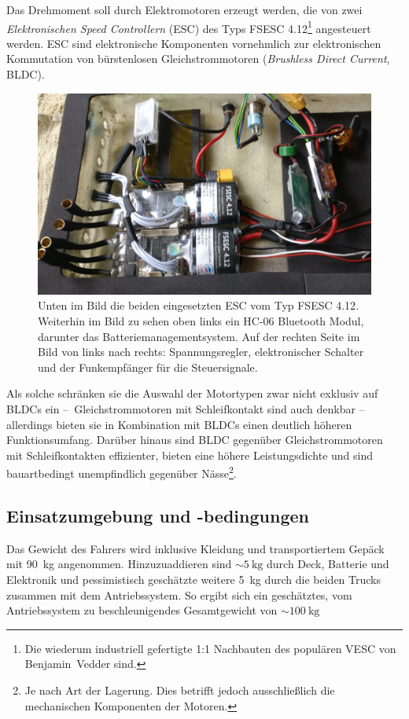 			Das Drehmoment soll durch Elektromotoren erzeugt werden, die von zwei \textit{Elektronischen Speed Controllern} (ESC) des Typs \textsc{FSESC 4.12}\footnote{\hspace{1mm} Die wiederum industriell gefertigte 1:1 Nachbauten des populären \textsc{VESC} von Benjamin~Vedder sind.} angesteuert werden.
			ESC sind elektronische Komponenten vornehmlich zur elektronischen Kommutation von bürstenlosen Gleichstrommotoren (\textit{Brushless Direct Current}, BLDC).
			\begin{figure}[h]
				\centering
				\includegraphics[width=.9\textwidth]{Footage/Pictures/Electronics.jpg}
				\caption[Eingesetzte ESC]{Unten im Bild die beiden eingesetzten ESC vom Typ \textsc{FSESC 4.12}. Weiterhin im Bild zu sehen oben links ein HC-06 Bluetooth Modul, darunter das Batteriemanagementsystem. Auf der rechten Seite im Bild von links nach rechts: Spannungsregler, elektronischer Schalter und der Funkempfänger für die Steuersignale.}\label{fig:electronics}
			\end{figure}
			Als solche schränken sie die Auswahl der Motortypen zwar nicht exklusiv auf BLDCs ein --~Gleichstrommotoren mit Schleifkontakt sind auch denkbar -- allerdings bieten sie in Kombination mit BLDCs einen deutlich höheren Funktionsumfang.
			Darüber hinaus sind BLDC gegenüber Gleichstrommotoren mit Schleifkontakten effizienter, bieten eine höhere Leistungsdichte und sind bauartbedingt unempfindlich gegenüber Nässe\footnote{\hspace{1mm} Je nach Art der Lagerung. Dies betrifft jedoch ausschließlich die mechanischen Komponenten der Motoren.}.
		\subsection{Einsatzumgebung und -bedingungen}
			Das Gewicht des Fahrers wird inklusive Kleidung und transportiertem Gepäck mit \qty{90}{\kilo\gram} angenommen.
			Hinzuzuaddieren sind \(\sim \qty{5}{\kilo\gram}\) durch Deck, Batterie und Elektronik und pessimistisch geschätzte weitere \qty{5}{\kilo\gram} durch die beiden Trucks zusammen mit dem Antriebssystem.
			So ergibt sich ein geschätztes, vom Antriebssystem zu beschleunigendes Gesamtgewicht von \(\sim \qty{100}{\kilo\gram}\)

